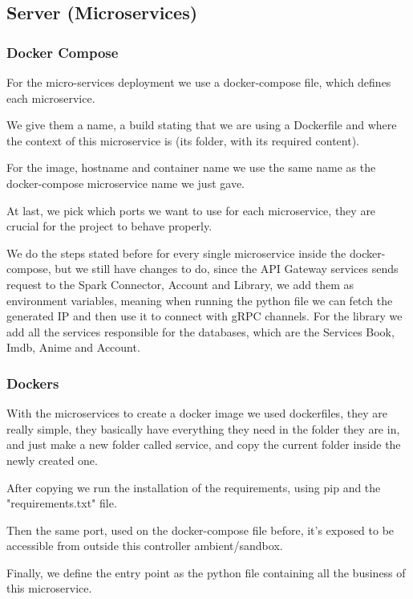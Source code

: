 \documentclass{article}
\newcommand*\fpar{\hspace{1ex}}
\begin{document}
    \subsection{Server (Microservices)}
      \subsubsection{Docker Compose}
      \fpar For the micro-services deployment we use a docker-compose file, which defines each microservice.
      \par We give them a name, a build stating that we are using a Dockerfile and where the context of this microservice is (its folder, with its required content).
      \par For the image, hostname and container name we use the same name as the docker-compose microservice name we just gave.
      \par At last, we pick which ports we want to use for each microservice, they are crucial for the project to behave properly.
      \par We do the steps stated before for every single microservice inside the docker-compose, but we still have changes to do, since the API Gateway services sends request to the Spark Connector, Account and Library, we add them as environment variables, meaning when running the python file we can fetch the generated IP and then use it to connect with gRPC channels. For the library we add all the services responsible for the databases, which are the Services Book, Imdb, Anime and Account.

      \subsubsection{Dockers}
      \fpar With the microservices to create a docker image we used dockerfiles, they are really simple, they basically have everything they need in the folder they are in, and just make a new folder called service, and copy the current folder inside the newly created one.
      \par After copying we run the installation of the requirements, using pip and the "requirements.txt" file.
      \par Then the same port, used on the docker-compose file before, it's exposed to be accessible from outside this controller ambient/sandbox.
      \par Finally, we define the entry point as the python file containing all the business of this microservice.
\end{document}
